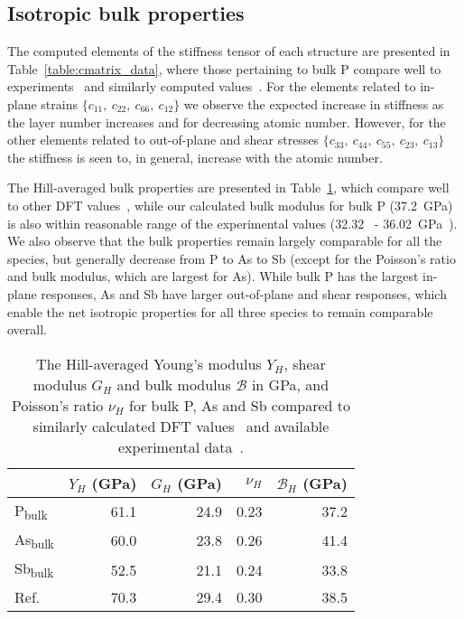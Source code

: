 \subsection{Isotropic bulk properties}

The computed elements of the stiffness tensor
of each structure 
are presented in Table~\ref{table:cmatrix_data}, 
where those pertaining to bulk P 
compare well to experiments~\cite{doi:10.1143/JPSJ.55.1196,doi:10.1143/JPSJ.60.1612} 
and similarly computed values~\cite{PhysRevB.86.035105,Wang2015}.
%
For the elements related  
to in-plane strains 
$\{c_{11},\ c_{22},\ c_{66},\ c_{12}\}$
we observe the expected increase in stiffness 
as the layer number increases 
and for decreasing atomic number.
%
However, for the other elements 
related to out-of-plane and shear stresses
$\{c_{33},\ c_{44},\ c_{55},\ c_{23},\ c_{13}\}$
the stiffness is seen to, in general, increase 
with the atomic number.


The Hill-averaged bulk properties 
are presented in Table~\ref{table:3dhill_data}, 
which compare well to other DFT values~\cite{PhysRevB.86.035105,Wang2015}, 
while our calculated  
bulk modulus for bulk P (37.2~GPa) 
is also within reasonable range of 
 the experimental values
(32.32~\cite{doi:10.1063/1.438523} - 
36.02~GPa~\cite{doi:10.1080/08957958908201013}).
%
We also observe that the bulk properties 
remain largely comparable for all the species, 
but generally decrease from P to As to Sb 
(except for the Poisson's ratio and bulk modulus, 
which are largest for As).
%
While bulk P has the largest in-plane responses, 
As and Sb have larger out-of-plane 
and shear responses, 
which enable the net isotropic properties 
for all three species to remain comparable overall.


\begin{table}[th!]
\centering
\begin{tabular}{lrrrr}
\hline\hline
&$Y_H$ (GPa) &$G_H$ (GPa)&$\nu_H$&$\mathcal{B}_H$ (GPa)\\
\hline
P\textsubscript{bulk}	&61.1	&24.9	&0.23	&37.2\\
As\textsubscript{bulk} &60.0	&23.8	&0.26	&41.4\\
Sb\textsubscript{bulk}&52.5	&21.1	&0.24	&33.8\\
Ref.~\cite{PhysRevB.86.035105}&70.3&29.4&0.30	&38.5\\
\hline\hline
\end{tabular}
\caption{
The Hill-averaged 
Young's modulus $Y_H$,
shear modulus $G_H$ 
and bulk modulus $\mathcal{B}$ in GPa, 
and Poisson's ratio $\nu_H$ 
for bulk P, As and Sb 
compared to similarly calculated DFT values~\cite{PhysRevB.86.035105} 
and available experimental data~\cite{doi:10.1063/1.438523,doi:10.1080/08957958908201013}.
}
\label{table:3dhill_data}
\end{table}

